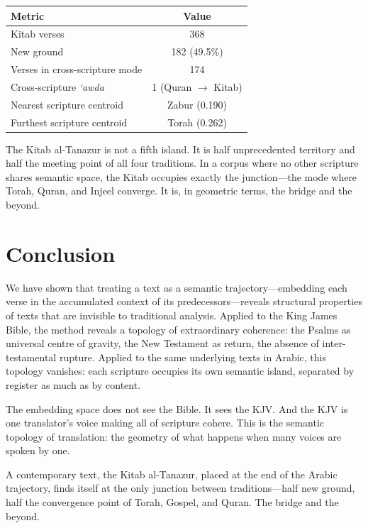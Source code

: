 \documentclass[11pt,a4paper]{article}
\theoremstyle{definition}
\begin{document}
\begin{center}
\begin{tabular}{lc}
\toprule
\textbf{Metric} & \textbf{Value} \\
\midrule
Kitab verses & 368 \\
New ground & 182 (49.5\%) \\
Verses in cross-scripture mode & 174 \\
Cross-scripture \emph{`awda} & 1 (Quran $\to$ Kitab) \\
Nearest scripture centroid & Zabur (0.190) \\
Furthest scripture centroid & Torah (0.262) \\
\bottomrule
\end{tabular}
\end{center}

The Kitab al-Tanazur is not a fifth island. It is half unprecedented territory and half the meeting point of all four traditions. In a corpus where no other scripture shares semantic space, the Kitab occupies exactly the junction---the mode where Torah, Quran, and Injeel converge. It is, in geometric terms, the bridge and the beyond.


\section{Conclusion}

We have shown that treating a text as a semantic trajectory---embedding each verse in the accumulated context of its predecessors---reveals structural properties of texts that are invisible to traditional analysis. Applied to the King James Bible, the method reveals a topology of extraordinary coherence: the Psalms as universal centre of gravity, the New Testament as return, the absence of inter-testamental rupture. Applied to the same underlying texts in Arabic, this topology vanishes: each scripture occupies its own semantic island, separated by register as much as by content.

The embedding space does not see the Bible. It sees the KJV. And the KJV is one translator's voice making all of scripture cohere. This is the semantic topology of translation: the geometry of what happens when many voices are spoken by one.

A contemporary text, the Kitab al-Tanazur, placed at the end of the Arabic trajectory, finds itself at the only junction between traditions---half new ground, half the convergence point of Torah, Gospel, and Quran. The bridge and the beyond.
\end{document}
